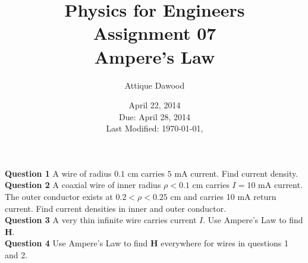 \documentclass[12pt,a4paper]{article}
\title{\vspace{-3cm}Physics for Engineers\\Assignment 07\\Ampere's Law}
\author{Attique Dawood}
\date{April 22, 2014\\Due: April 28, 2014\\[0.2cm] Last Modified: \today, \currenttime}
\begin{document}
\maketitle
\noindent\textbf{Question 1} A wire of radius $0.1$ cm carries $5$ mA current. Find current density.\\[0.2cm]
\noindent\textbf{Question 2} A coaxial wire of inner radius $\rho<0.1$ cm carries $I=10$ mA current. The outer conductor exists at $0.2<\rho<0.25$ cm and carries 10 mA return current. Find current densities in inner and outer conductor.\\[0.2cm]
\noindent\textbf{Question 3} A very thin infinite wire carries current $I$. Use Ampere's Law to find \textbf{H}.\\[0.2cm]
\noindent\textbf{Question 4} Use Ampere's Law to find \textbf{H} everywhere for wires in questions 1 and 2.\\[0.2cm]


\end{document}
